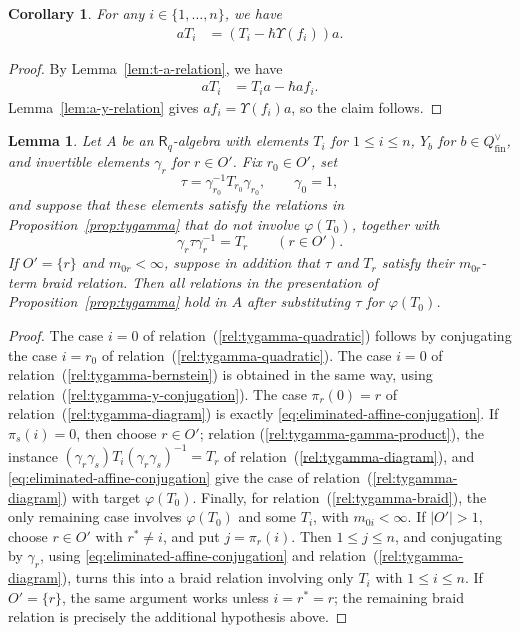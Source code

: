 \documentclass{amsart}
\newcommand{\Ring}{\mathsf{R}}
\newtheorem{Lem}[Thm]{Lemma}
\newtheorem{Cor}[Thm]{Corollary}
\theoremstyle{definition}
\numberwithin{equation}{section}
\begin{document}
\begin{Cor}\label{cor:a-t-relation}
    For any $i \in \{1, \dots, n\}$, we have
    \begin{align}
        aT_i & = (T_i - \hbar \Upsilon(f_i))a.
    \end{align}
\end{Cor}
\begin{proof}
    By Lemma~\ref{lem:t-a-relation}, we have
    \begin{align}
        aT_i & = T_ia - \hbar af_i.
    \end{align}
    Lemma~\ref{lem:a-y-relation} gives $af_i=\Upsilon(f_i)a$, so the claim follows.
\end{proof}

\begin{Lem}\label{lem:eliminated-t0-relations}
Let \(A\) be an \(\Ring_q\)-algebra with elements \(T_i\) for \(1\leqslant i\leqslant n\),
\(Y_b\) for \(b\in Q_{\mathrm{fin}}^\vee\), and invertible elements \(\gamma_r\) for \(r\in O'\).
Fix \(r_0\in O'\), set
\[
\tau=\gamma_{r_0}^{-1}T_{r_0}\gamma_{r_0},
\qquad
\gamma_0=1,
\]
and suppose that these elements satisfy the relations in
Proposition~\ref{prop:tygamma} that do not involve \(\varphi(T_0)\), together with
\begin{equation}\label{eq:eliminated-affine-conjugation}
\gamma_r\tau\gamma_r^{-1}=T_r\qquad(r\in O').
\end{equation}
If \(O'=\{r\}\) and \(m_{0r}<\infty\), suppose in addition that
\(\tau\) and \(T_r\) satisfy their \(m_{0r}\)-term braid relation.
Then all relations in the presentation of Proposition~\ref{prop:tygamma} hold
in \(A\) after substituting \(\tau\) for \(\varphi(T_0)\).
\end{Lem}
\begin{proof}
The case \(i=0\) of relation~(\ref{rel:tygamma-quadratic}) follows by conjugating
the case \(i=r_0\) of relation~(\ref{rel:tygamma-quadratic}). The case \(i=0\)
of relation~(\ref{rel:tygamma-bernstein}) is obtained in the same way, using
relation~(\ref{rel:tygamma-y-conjugation}). The
case \(\pi_r(0)=r\) of relation~(\ref{rel:tygamma-diagram}) is
exactly \eqref{eq:eliminated-affine-conjugation}. If
\(\pi_s(i)=0\), then choose \(r\in O'\); relation
(\ref{rel:tygamma-gamma-product}), the instance
\((\gamma_r\gamma_s)T_i(\gamma_r\gamma_s)^{-1}=T_r\) of
relation~(\ref{rel:tygamma-diagram}), and
\eqref{eq:eliminated-affine-conjugation} give the case of
relation~(\ref{rel:tygamma-diagram}) with target \(\varphi(T_0)\). Finally, for
relation~(\ref{rel:tygamma-braid}), the only remaining case involves \(\varphi(T_0)\) and
some \(T_i\), with \(m_{0i}<\infty\). If \(|O'|>1\), choose \(r\in O'\)
with \(r^*\neq i\), and put \(j=\pi_r(i)\). Then \(1\leqslant j\leqslant n\), and
conjugating by \(\gamma_r\), using
\eqref{eq:eliminated-affine-conjugation} and
relation~(\ref{rel:tygamma-diagram}), turns this into a braid relation
involving only $T_i$ with $1\leqslant i\leqslant n$. If \(O'=\{r\}\), the same argument works
unless \(i=r^*=r\); the remaining braid relation is precisely the additional
hypothesis above.
\end{proof}
\end{document}
